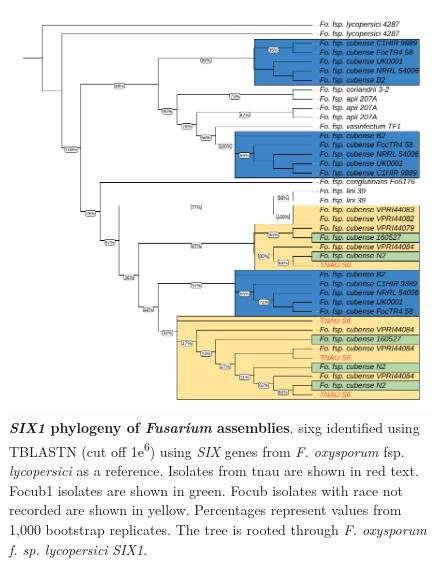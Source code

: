 \begin{figure}[htp!]
  \centering
  \includegraphics[]{Figures/FusSIX1.phylo.pdf}
  \caption[\textit{SIX1} phylogeny of \textit{Fusarium} assemblies]{\textbf{\textit{SIX1} phylogeny of \textit{Fusarium} assemblies}. \acl{sixg} identified using TBLASTN (cut off 1\-e\textsuperscript{6}) using \textit{SIX} genes from \textit{F. oxysporum} fsp. \textit{lycopersici} as a reference. Isolates from \ac{tnau} are shown in red text. \Acl{Focub1} isolates are shown in green. \acl{Focub} isolates with race not recorded are shown in yellow. Percentages represent values from 1,000 bootstrap replicates. The tree is rooted through \textit{F. oxysporum f. sp. lycopersici} \textit{SIX1}.}
  \label{fig:FusSIX1}
\end{figure}


